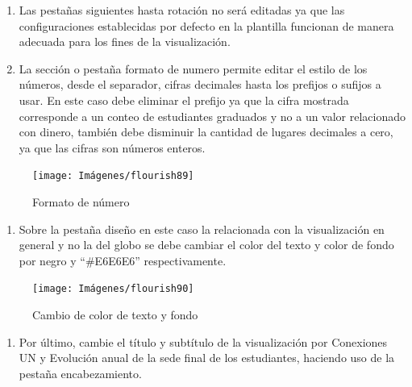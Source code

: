 \documentclass[
]{book}
\providecommand{\tightlist}{%
  \setlength{\itemsep}{0pt}\setlength{\parskip}{0pt}}
\begin{document}
\begin{enumerate}
\def\labelenumi{\arabic{enumi}.}
\setcounter{enumi}{4}
\item
  Las pestañas siguientes hasta rotación no será editadas ya que las configuraciones establecidas por defecto en la plantilla funcionan de manera adecuada para los fines de la visualización.
\item
  La sección o pestaña formato de numero permite editar el estilo de los números, desde el separador, cifras decimales hasta los prefijos o sufijos a usar. En este caso debe eliminar el prefijo ya que la cifra mostrada corresponde a un conteo de estudiantes graduados y no a un valor relacionado con dinero, también debe disminuir la cantidad de lugares decimales a cero, ya que las cifras son números enteros.
\end{enumerate}

\begin{figure}

{\centering \texttt{[image: Imágenes/flourish89]} 

}

\caption{Formato de número}\label{fig:paso6globoconexionesflourish-fig}
\end{figure}

\begin{enumerate}
\def\labelenumi{\arabic{enumi}.}
\setcounter{enumi}{6}
\tightlist
\item
  Sobre la pestaña diseño en este caso la relacionada con la visualización en general y no la del globo se debe cambiar el color del texto y color de fondo por negro y ``\#E6E6E6'' respectivamente.
\end{enumerate}

\begin{figure}

{\centering \texttt{[image: Imágenes/flourish90]} 

}

\caption{Cambio de color de texto y fondo}\label{fig:paso7globoconexionesflourish-fig}
\end{figure}

\begin{enumerate}
\def\labelenumi{\arabic{enumi}.}
\setcounter{enumi}{7}
\tightlist
\item
  Por último, cambie el título y subtítulo de la visualización por Conexiones UN y Evolución anual de la sede final de los estudiantes, haciendo uso de la pestaña encabezamiento.
\end{enumerate}
\end{document}

